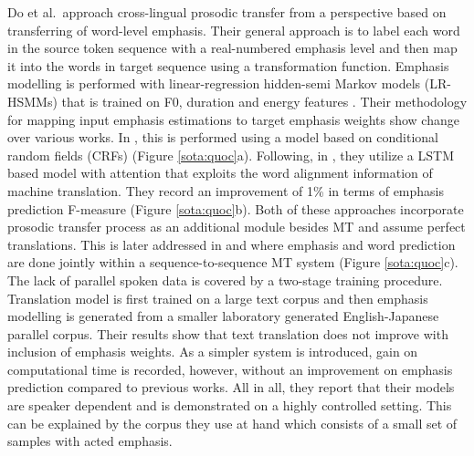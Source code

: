 Do et al.~approach cross-lingual prosodic transfer from a perspective based on transferring of word-level emphasis. Their general approach is to label each word in the source token sequence with a real-numbered emphasis level and then map it into the words in target sequence using a transformation function. Emphasis modelling is performed with linear-regression hidden-semi Markov models (LR-HSMMs) that is trained on F0, duration and energy features \citep{Quoc2016}. Their methodology for mapping input emphasis estimations to target emphasis weights show change over various works. In \cite{Quoc2016}, this is performed using a model based on conditional random fields (CRFs) (Figure \ref{sota:quoc}a). Following, in \cite{Quoc2016b}, they utilize a LSTM based model with attention that exploits the word alignment information of machine translation. They record an improvement of 1\% in terms of emphasis prediction F-measure (Figure \ref{sota:quoc}b). Both of these approaches incorporate prosodic transfer process as an additional module besides MT and assume perfect translations. This is later addressed in \cite{Quoc2017} and \cite{Quoc2018} where emphasis and word prediction are done jointly within a sequence-to-sequence MT system (Figure \ref{sota:quoc}c). The lack of parallel spoken data is covered by a two-stage training procedure. Translation model is first trained on a large text corpus and then emphasis modelling is generated from a smaller laboratory generated English-Japanese parallel corpus. Their results show that text translation does not improve with inclusion of emphasis weights. As a simpler system is introduced, gain on computational time is recorded, however, without an improvement on emphasis prediction compared to previous works. All in all, they report that their models are speaker dependent and is demonstrated on a highly controlled setting. This can be explained by the corpus they use at hand which consists of a small set of samples with acted emphasis. 

